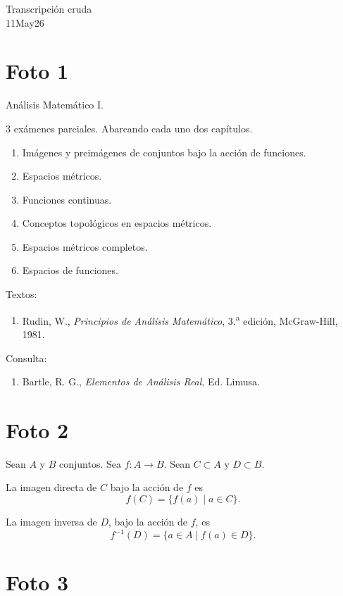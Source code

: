 \documentclass[12pt]{article}
\newcommand{\dudoso}[1]{\textsf{#1}}
\begin{document}
\begin{center}
{\Large Transcripción cruda}\\[2mm]
{\large 11May26}
\end{center}

\section*{Foto 1}

An\'alisis Matem\'atico I.

3 ex\'amenes parciales.
Abarcando cada uno dos cap\'itulos.

\begin{enumerate}[label=\arabic*.]
    \item Im\'agenes y preim\'agenes de conjuntos bajo la acci\'on de funciones.
    \item Espacios m\'etricos.
    \item Funciones continuas.
    \item Conceptos topol\'ogicos en espacios m\'etricos.
    \item Espacios m\'etricos completos.
    \item Espacios de funciones.
\end{enumerate}

Textos:
\begin{enumerate}[label=\arabic*.]
    \item Rudin, W., \textit{Principios de An\'alisis Matem\'atico}, 3.\textsuperscript{a} edici\'on, McGraw-Hill, \dudoso{1981}.
\end{enumerate}

Consulta:
\begin{enumerate}[label=\arabic*.]
    \item Bartle, R. G., \textit{Elementos de An\'alisis Real}, Ed. Limusa.
\end{enumerate}

\section*{Foto 2}

Sean $A$ y $B$ conjuntos. Sea $f\colon A\to B$.
Sean $C\subset A$ y $D\subset B$.

La imagen directa de $C$ bajo la acci\'on de $f$ es
\[
f(C)=\{f(a)\mid a\in C\}.
\]

La imagen inversa de $D$, bajo la acci\'on de $f$, es
\[
f^{-1}(D)=\{a\in A\mid f(a)\in D\}.
\]

\section*{Foto 3}
\end{document}
